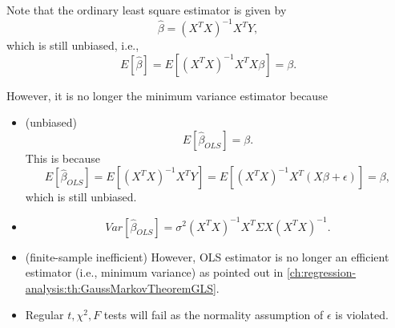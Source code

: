 \begin{refsection}
\begin{note}\cite[302]{greene2017econometric}\label{ch:regression-analysis:remark:propertiesOLSwithStructuralError}
	Note that the ordinary least square estimator is given by
	$$\hat{\beta} = (X^TX)^{-1}X^TY,$$
	which is still unbiased, i.e., $$E[\hat{\beta}] = E[(X^TX)^{-1}X^TX\beta] = \beta.$$
	
	However, it is no longer the minimum variance estimator because
\begin{itemize}
	\item (unbiased)
	$$E[\hat{\beta}_{OLS}] = \beta.$$
	This is because 
	$$E[\hat{\beta}_{OLS}] = E[(X^TX)^{-1}X^TY]=E[(X^TX)^{-1}X^T(X\beta + \epsilon)] = \beta,$$
	which is still unbiased.
	\item 	$$Var[\hat{\beta}_{OLS}] = \sigma^2 (X^TX)^{-1}X^T\Sigma X(X^TX)^{-1}.$$
	\item (finite-sample inefficient)
	However, OLS estimator is no longer an efficient estimator (i.e., minimum variance) as pointed out in \autoref{ch:regression-analysis:th:GaussMarkovTheoremGLS}.
	\item Regular $t, \chi^2, F$ tests will fail as the normality assumption of $\epsilon$ is violated.
	
\end{itemize}	
\end{note}



\end{refsection}
